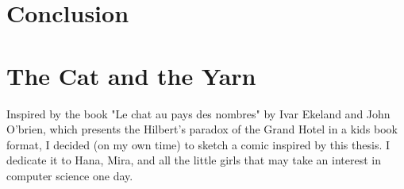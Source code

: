 \clearemptydoublepage
\backmatter

\chapter*{Conclusion}

\newpage
\chapter*{The Cat and the Yarn}

Inspired by the book "Le chat au pays des nombres" by Ivar Ekeland and John O'brien, which presents the Hilbert's paradox of the Grand Hotel in a kids book format, I decided (on my own time) to sketch a comic inspired by this thesis. I dedicate it to Hana, Mira, and all the little girls that may take an interest in computer science one day.
\vfill
\begin{center}
\end{center}
\vfill